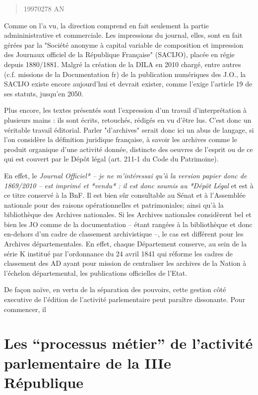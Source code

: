 \begin{quote} 19970278 AN\end{quote}

Comme on l'a vu, la direction comprend en fait seulement la partie admininistrative et commerciale. Les impressions du journal, elles, sont en fait gérées par la "Société anonyme à capital variable de composition et impression des Journaux officiel de la République Française" (SACIJO), placée en régie depuis 1880/1881. Malgré la création de la DILA en 2010 chargé, entre autres (c.f. missions de la Documentation fr) de la publication numériques des J.O., la SACIJO existe encore aujourd'hui et devrait exister, comme l'exige l'article 19 de ses statuts, jusqu'en 2050.

Plus encore, les textes présentés sont l'expression d'un travail d'interprétation à plusieurs mains : ils sont écrits, retouchés, rédigés en vu d'être lus. C'est donc un véritable travail éditorial. Parler "d'archives" serait donc ici un abus de langage, si l'on considère la définition juridique française, à savoir les archives comme le produit organique d'une activité donnée, distincte des oeuvres de l'esprit ou de ce qui est couvert par le Dépôt légal (art. 211-1 du Code du Patrimoine).

En effet, le \textit{Journal Officiel* -- je ne m'intéressai qu'à la version papier donc de 1869/2010 -- est imprimé et *vendu* : il est donc soumis au *Dépôt Légal} et est à ce titre conservé à la BnF. Il est bien sûr consultable au Sénat et à l'Assemblée nationale pour des raisons opérationnelles et patrimoniales; ainsi qu'à la bibliothèque des Archives nationales. Si les Archives nationales considèrent bel et bien les JO comme de la documentation -- étant rangées à la bibliothèque et donc en-dehors d'un cadre de classement archivistique --, le cas est différent pour les Archives départementales. En effet, chaque Département conserve, au sein de la série K institué par l'ordonnance du 24 avril 1841 qui réforme les cadres de classement des AD ayant pour mission de centraliser les archives de la Nation à l'échelon départemental, les publications officielles de l'Etat.

De façon naïve, en vertu de la séparation des pouvoirs, cette gestion côté executive de l'édition de l'activité parlementaire peut paraître dissonante. Pour commencer, il


\section{Les \enquote{processus métier} de l'activité parlementaire de la IIIe République}

